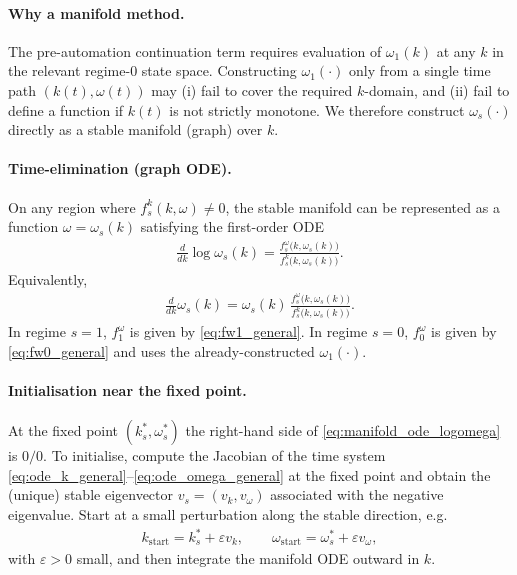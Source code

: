 \documentclass{article}
\begin{document}
\paragraph{Why a manifold method.}
The pre-automation continuation term requires evaluation of $\omega_1(k)$ at any
$k$ in the relevant regime-$0$ state space. Constructing $\omega_1(\cdot)$ only from a
single time path $(k(t),\omega(t))$ may (i) fail to cover the required $k$-domain, and
(ii) fail to define a function if $k(t)$ is not strictly monotone. We therefore construct
$\omega_s(\cdot)$ directly as a stable manifold (graph) over $k$.

\paragraph{Time-elimination (graph ODE).}
On any region where $f^k_s(k,\omega)\neq 0$, the stable manifold can be represented as
a function $\omega=\omega_s(k)$ satisfying the first-order ODE
\begin{align}
\frac{d}{dk}\log\omega_s(k)
=\frac{f^\omega_s\!\big(k,\omega_s(k)\big)}{f^k_s\!\big(k,\omega_s(k)\big)}. \label{eq:manifold_ode_logomega}
\end{align}
Equivalently,
\begin{align}
\frac{d}{dk}\omega_s(k)
=\omega_s(k)\,\frac{f^\omega_s\!\big(k,\omega_s(k)\big)}{f^k_s\!\big(k,\omega_s(k)\big)}. \label{eq:manifold_ode_omega}
\end{align}
In regime $s=1$, $f^\omega_1$ is given by \eqref{eq:fw1_general}. In regime $s=0$,
$f^\omega_0$ is given by \eqref{eq:fw0_general} and uses the already-constructed
$\omega_1(\cdot)$.

\paragraph{Initialisation near the fixed point.}
At the fixed point $(k_s^\ast,\omega_s^\ast)$ the right-hand side of
\eqref{eq:manifold_ode_logomega} is $0/0$. To initialise, compute the Jacobian of the
time system \eqref{eq:ode_k_general}--\eqref{eq:ode_omega_general} at the fixed point and
obtain the (unique) stable eigenvector $v_s=(v_k,v_\omega)$ associated with the negative
eigenvalue. Start at a small perturbation along the stable direction, e.g.
\begin{align}
k_{\mathrm{start}} = k_s^\ast + \varepsilon v_k,\qquad
\omega_{\mathrm{start}} = \omega_s^\ast + \varepsilon v_\omega,
\end{align}
with $\varepsilon>0$ small, and then integrate the manifold ODE outward in $k$.
\end{document}
